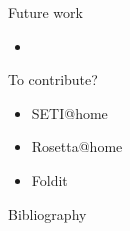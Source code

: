 \documentclass[first=dgreen,second=purple,logo=yellowexc]{aaltoslides}
\begin{document}
{\begin{frame}{Future work}
	\begin{itemize}
		\item 
	\end{itemize}
\end{frame}

\begin{frame}{To contribute?}
	\begin{itemize}
		\item SETI@home
		\item Rosetta@home
		\item Foldit
	\end{itemize}
\end{frame}





\begin{frame}[allowframebreaks]{Bibliography}
%

 
\end{frame}

}
\end{document}
